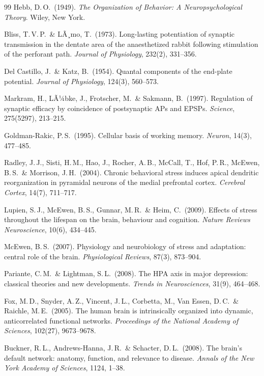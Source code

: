 ﻿\documentclass[a4paper,12pt]{article}
\theoremstyle{definition}
\begin{document}
\begin{thebibliography}{99}
	Hebb, D.\,O.\ (1949).
	\textit{The Organization of Behavior: A Neuropsychological Theory}.
	Wiley, New York.

	Bliss, T.\,V.\,P.\ \& LÃ¸mo, T.\ (1973).
	Long-lasting potentiation of synaptic transmission in the dentate area of the anaesthetized rabbit following stimulation of the perforant path.
	\textit{Journal of Physiology}, 232(2), 331--356.

	Del Castillo, J.\ \& Katz, B.\ (1954).
	Quantal components of the end-plate potential.
	\textit{Journal of Physiology}, 124(3), 560--573.

	Markram, H., LÃ¼bke, J., Frotscher, M.\ \& Sakmann, B.\ (1997).
	Regulation of synaptic efficacy by coincidence of postsynaptic APs and EPSPs.
	\textit{Science}, 275(5297), 213--215.

	Goldman-Rakic, P.\,S.\ (1995).
	Cellular basis of working memory.
	\textit{Neuron}, 14(3), 477--485.

	Radley, J.\,J., Sisti, H.\,M., Hao, J., Rocher, A.\,B., McCall, T., Hof, P.\,R., McEwen, B.\,S.\ \& Morrison, J.\,H.\ (2004).
	Chronic behavioral stress induces apical dendritic reorganization in pyramidal neurons of the medial prefrontal cortex.
	\textit{Cerebral Cortex}, 14(7), 711--717.

	Lupien, S.\,J., McEwen, B.\,S., Gunnar, M.\,R.\ \& Heim, C.\ (2009).
	Effects of stress throughout the lifespan on the brain, behaviour and cognition.
	\textit{Nature Reviews Neuroscience}, 10(6), 434--445.

	McEwen, B.\,S.\ (2007).
	Physiology and neurobiology of stress and adaptation: central role of the brain.
	\textit{Physiological Reviews}, 87(3), 873--904.

	Pariante, C.\,M.\ \& Lightman, S.\,L.\ (2008).
	The HPA axis in major depression: classical theories and new developments.
	\textit{Trends in Neurosciences}, 31(9), 464--468.

	Fox, M.\,D., Snyder, A.\,Z., Vincent, J.\,L., Corbetta, M., Van Essen, D.\,C.\ \& Raichle, M.\,E.\ (2005).
	The human brain is intrinsically organized into dynamic, anticorrelated functional networks.
	\textit{Proceedings of the National Academy of Sciences}, 102(27), 9673--9678.

	Buckner, R.\,L., Andrews-Hanna, J.\,R.\ \& Schacter, D.\,L.\ (2008).
	The brain's default network: anatomy, function, and relevance to disease.
	\textit{Annals of the New York Academy of Sciences}, 1124, 1--38.


\end{thebibliography}
\end{document}
